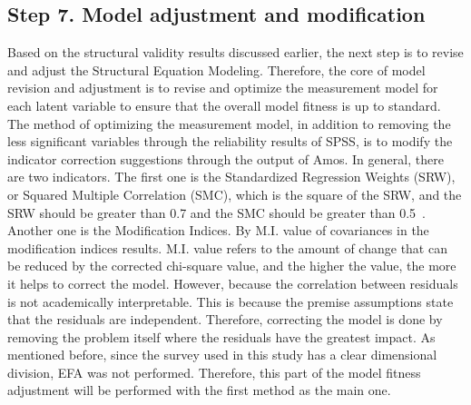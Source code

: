 \subsection{Step 7. Model adjustment and modification}
\label{s7}
Based on the structural validity results discussed earlier, the next step is to revise and adjust the Structural Equation Modeling. Therefore, the core of model revision and adjustment is to revise and optimize the measurement model for each latent variable to ensure that the overall model fitness is up to standard. The method of optimizing the measurement model, in addition to removing the less significant variables through the reliability results of SPSS, is to modify the indicator correction suggestions through the output of Amos. In general, there are two indicators. The first one is the Standardized Regression Weights (SRW), or Squared Multiple Correlation (SMC), which is the square of the SRW, and the SRW should be greater than 0.7 and the SMC should be greater than 0.5~\cite{ref15,ref27}. Another one is the Modification Indices. By M.I. value of covariances in the modification indices results. M.I. value refers to the amount of change that can be reduced by the corrected chi-square value, and the higher the value, the more it helps to correct the model. However, because the correlation between residuals is not academically interpretable. This is because the premise assumptions state that the residuals are independent. Therefore, correcting the model is done by removing the problem itself where the residuals have the greatest impact. As mentioned before, since the survey used in this study has a clear dimensional division, EFA was not performed. Therefore, this part of the model fitness adjustment will be performed with the first method as the main one.



